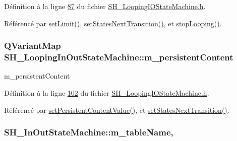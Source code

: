Définition à la ligne \hyperlink{SH__LoopingIOStateMachine_8h_source_l00087}{87} du fichier \hyperlink{SH__LoopingIOStateMachine_8h_source}{S\-H\-\_\-\-Looping\-I\-O\-State\-Machine.\-h}.



Référencé par \hyperlink{classSH__LoopingInOutStateMachine_a6dbf2fbcc6524bba5a70baadb8d61be4}{set\-Limit()}, \hyperlink{classSH__LoopingInOutStateMachine_a0ee122553641721012f3710e71cce234}{set\-States\-Next\-Transition()}, et \hyperlink{classSH__LoopingInOutStateMachine_a73d75e30318da22fec99387e9bf02a9b}{stop\-Looping()}.

\hypertarget{classSH__LoopingInOutStateMachine_a4e9ea23cf1eecbe26c6ed93b290a9115}{
\subsubsection[{m\-\_\-persistent\-Content}]{\setlength{\rightskip}{0pt plus 5cm}Q\-Variant\-Map S\-H\-\_\-\-Looping\-In\-Out\-State\-Machine\-::m\-\_\-persistent\-Content\hspace{0.3cm}{\ttfamily [private]}}}\label{classSH__LoopingInOutStateMachine_a4e9ea23cf1eecbe26c6ed93b290a9115}


m\-\_\-persistent\-Content 



Définition à la ligne \hyperlink{SH__LoopingIOStateMachine_8h_source_l00102}{102} du fichier \hyperlink{SH__LoopingIOStateMachine_8h_source}{S\-H\-\_\-\-Looping\-I\-O\-State\-Machine.\-h}.



Référencé par \hyperlink{classSH__LoopingInOutStateMachine_a99686121d80e3de4c64bebb1d5890ac0}{set\-Persistent\-Content\-Value()}, et \hyperlink{classSH__LoopingInOutStateMachine_a0ee122553641721012f3710e71cce234}{set\-States\-Next\-Transition()}.

\hypertarget{classSH__InOutStateMachine_aa009eecc5ab6181358faafb5996b6006}{
\subsubsection[{m\-\_\-table\-Name}]{\setlength{\rightskip}{0pt plus 5cm}S\-H\-\_\-\-In\-Out\-State\-Machine\-::m\-\_\-table\-Name\hspace{0.3cm}{\ttfamily [protected]}, {\ttfamily [inherited]}}}\label{classSH__InOutStateMachine_aa009eecc5ab6181358faafb5996b6006}


